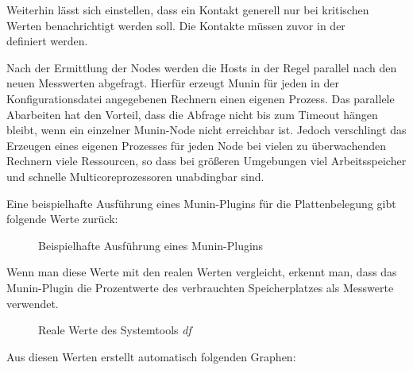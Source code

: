 Weiterhin lässt sich einstellen, dass ein Kontakt generell nur bei kritischen Werten benachrichtigt werden soll.
Die Kontakte müssen zuvor in der \\  definiert werden.

Nach der Ermittlung der Nodes werden die Hosts in der Regel parallel nach den neuen Messwerten abgefragt.
Hierfür erzeugt Munin  für jeden in der Konfigurationsdatei angegebenen Rechnern einen eigenen Prozess.
Das parallele Abarbeiten hat den Vorteil, dass die Abfrage nicht bis zum Timeout hängen bleibt, wenn ein einzelner Munin-Node nicht erreichbar ist.
Jedoch verschlingt das Erzeugen eines eigenen Prozesses für jeden Node bei vielen zu überwachenden Rechnern viele Ressourcen, so dass bei größeren Umgebungen viel Arbeitsspeicher und schnelle Multicoreprozessoren unabdingbar sind.

Eine beispielhafte Ausführung eines Munin-Plugins für die Plattenbelegung gibt folgende Werte zurück:

\begin{figure}[ht]
	\centering
		\caption{Beispielhafte Ausführung eines Munin-Plugins}
		\label{df-munin}
\end{figure}
\newpage
Wenn man diese Werte mit den realen Werten vergleicht, erkennt man, dass das Munin-Plugin die Prozentwerte des verbrauchten Speicherplatzes als Messwerte verwendet.

\begin{figure}[ht]
	\centering
		\caption{Reale Werte des Systemtools \textit{df}}
		\label{df}
\end{figure}

Aus diesen Werten erstellt  automatisch folgenden Graphen:

